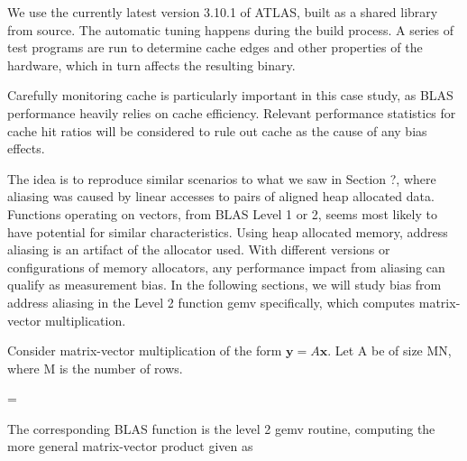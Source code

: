 \documentclass[a4paper,10pt,twocolumn,twoside]{article}
\begin{document}
We use the currently latest version 3.10.1 of ATLAS, built as a shared library from source.
The automatic tuning happens during the build process.
A series of test programs are run to determine cache edges and other properties of the hardware, which in turn affects the resulting binary. 

Carefully monitoring cache is particularly important in this case study, as BLAS performance heavily relies on cache efficiency.
Relevant performance statistics for cache hit ratios will be considered to rule out cache as the cause of any bias effects.

The idea is to reproduce similar scenarios to what we saw in Section ?, where aliasing was caused by linear accesses to pairs of aligned heap allocated data.
Functions operating on vectors, from BLAS Level 1 or 2, seems most likely to have potential for similar characteristics.
Using heap allocated memory, address aliasing is an artifact of the allocator used.
With different versions or configurations of memory allocators, any performance impact from aliasing can qualify as measurement bias.
In the following sections, we will study bias from address aliasing in the Level 2 function gemv specifically, which computes matrix-vector multiplication.

\iffalse

Consider matrix-vector multiplication of the form $\boldsymbol{y}=A\boldsymbol{x}$. Let A be of size M\times N, where M is the number of rows. 

=

The corresponding BLAS function is the level 2 gemv routine, computing the more general matrix-vector product given as
\end{document}
